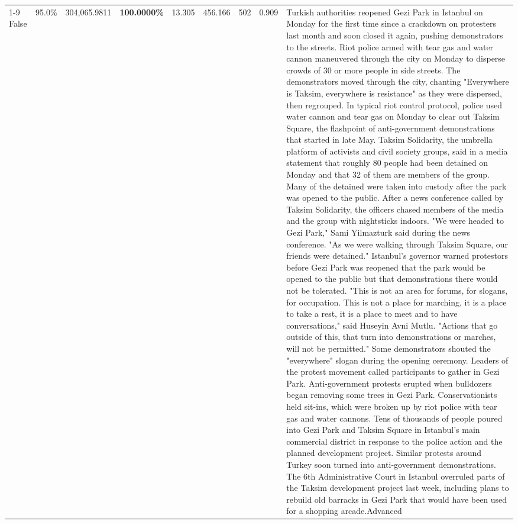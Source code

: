 \begin{table}[H]
\begin{tabular}{lllrlllll}
\cline{1-9}
False & 95.0\% & 304,065.9811 & \bfseries \color{red} 100.0000\% & 13.305 & 456.166 & 502 & 0.909 & Turkish authorities reopened Gezi Park in Istanbul on Monday for the first time since a crackdown on protesters last month and soon closed it again, pushing demonstrators to the streets. Riot police armed with tear gas and water cannon maneuvered through the city on Monday to disperse crowds of 30 or more people in side streets. The demonstrators moved through the city, chanting "Everywhere is Taksim, everywhere is resistance" as they were dispersed, then regrouped. In typical riot control protocol, police used water cannon and tear gas on Monday to clear out Taksim Square, the flashpoint of anti-government demonstrations that started in late May. Taksim Solidarity, the umbrella platform of activists and civil society groups, said in a media statement that roughly 80 people had been detained on Monday and that 32 of them are members of the group. Many of the detained were taken into custody after the park was opened to the public. After a news conference called by Taksim Solidarity, the officers chased members of the media and the group with nightsticks indoors. "We were headed to Gezi Park," Sami Yilmazturk said during the news conference. "As we were walking through Taksim Square, our friends were detained." Istanbul's governor warned protestors before Gezi Park was reopened that the park would be opened to the public but that demonstrations there would not be tolerated. "This is not an area for forums, for slogans, for occupation. This is not a place for marching, it is a place to take a rest, it is a place to meet and to have conversations," said Huseyin Avni Mutlu. "Actions that go outside of this, that turn into demonstrations or marches, will not be permitted." Some demonstrators shouted the "everywhere" slogan during the opening ceremony. Leaders of the protest movement called participants to gather in Gezi Park. Anti-government protests erupted when bulldozers began removing some trees in Gezi Park. Conservationists held sit-ins, which were broken up by riot police with tear gas and water cannons. Tens of thousands of people poured into Gezi Park and Taksim Square in Istanbul's main commercial district in response to the police action and the planned development project. Similar protests around Turkey soon turned into anti-government demonstrations. The 6th Administrative Court in Istanbul overruled parts of the Taksim development project last week, including plans to rebuild old barracks in Gezi Park that would have been used for a shopping arcade.Advanced \\

\end{tabular}
\end{table}
